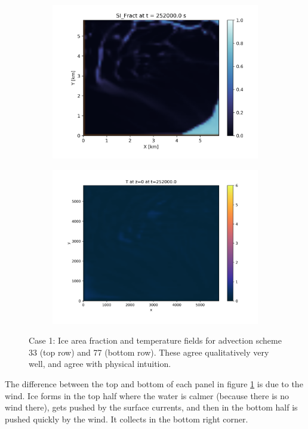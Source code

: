 \documentclass[11pt]{article}
\begin{document}
\begin{figure}[h!]
\begin{subfigure}{0.45\linewidth}
\includegraphics[width=\linewidth]{iceAdvect/advScheme-77-surface-ice-hd-0000025200.png}
\end{subfigure}
\begin{subfigure}{0.45\linewidth}
\includegraphics[width=\linewidth]{iceAdvect/advScheme-77-surface-T-hd-0000025200.png}
\end{subfigure}

\caption{Case 1: Ice area fraction and temperature fields for advection scheme 33 (top row) and 77 (bottom row). These agree qualitatively very well, and agree with physical intuition. }
\label{fig:advSchemes}
\end{figure}
The difference between the top and bottom of each panel in figure \ref{fig:advSchemes} is due to the wind. Ice forms in the top half where the water is calmer (because there is no wind there), gets pushed by the surface currents, and then in the bottom half is pushed quickly by the wind. It collects in the bottom right corner.
\end{document}
